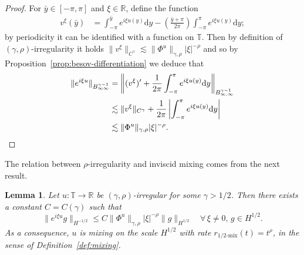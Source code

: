 \documentclass[11pt,oneside,reqno]{amsart}
\newcommand{\mathd}{\mathrm{d}}
\newtheorem{lemma}[theorem]{Lemma}
\numberwithin{equation}{section}
\begin{document}
\begin{proof}
  For $\bar{y} \in [- \pi, \pi]$ and $\xi \in \mathbb{R}$, define the function
%  
  \begin{align*}
    v^{\xi} (\bar{y}) & = \int_{- \pi}^{\bar{y}} e^{i \xi u (y)} \mathd y -
    \left( \frac{\bar{y} + \pi}{2 \pi} \right) \int_{- \pi}^{\pi} e^{i \xi u
    (y)} \mathd y ;
  \end{align*}
%  
  by periodicity it can be identified with a function on $\mathbb{T}$. Then by
  definition of $(\gamma, \rho)$-irregularity it holds $\| v^{\xi}
  \|_{C^{\gamma}} \lesssim \| \Phi^u \|_{\gamma, \rho}  | \xi |^{- \rho}$ and
  so by Proposition~\ref{prop:besov-differentiation} we deduce that
\begin{equation*}\begin{split}
	\| e^{i \xi u} \|_{B^{\gamma - 1}_{\infty \infty}}
	& = \left\|
       (v^{\xi})' + \frac{1}{2 \pi} \int_{- \pi}^{\pi} e^{i \xi u (y)} \mathd
       y \right\|_{B^{\gamma - 1}_{\infty, \infty}}\\
       & \lesssim \| v^{\xi} \|_{C^{\gamma}} + \frac{1}{2 \pi} \left|
       \int_{- \pi}^{\pi} e^{i \xi u (y)} \mathd y \right|\\
       & \lesssim \| \Phi^u \|_{\gamma, \rho}  | \xi |^{- \rho} .\qedhere
\end{split}\end{equation*}
%
\end{proof}

The relation between $\rho$-irregularity and inviscid mixing comes from the
next result.

\begin{lemma}
  \label{lem:estim-mixing-rho}Let $u : \mathbb{T} \rightarrow \mathbb{R}$ be
  $(\gamma, \rho)$-irregular for some $\gamma > 1 / 2$. Then there exists a
  constant $C = C (\gamma)$ such that
  \begin{equation}
    \| e^{i \xi u} g \|_{H^{- 1 / 2}} \leqslant C \| \Phi^u \|_{\gamma, \rho} 
    | \xi |^{- \rho} \| g \|_{H^{1 / 2}}  \quad \forall \, \xi \neq 0, \, g
    \in H^{1 / 2} . \label{eq:estim-mixing-rho}
  \end{equation}
  As a consequence, $u$ is mixing on the scale $H^{1 / 2}$ with rate
  $r_{1 / 2 \text{-mix}} (t) = t^{\rho}$, in the sense of
  Definition~\ref{def:mixing}.
\end{lemma}
\end{document}
